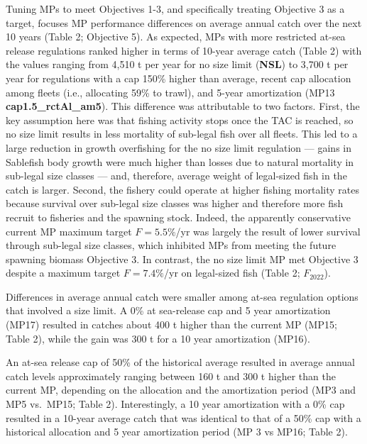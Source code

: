 \documentclass[11pt]{book}
\begin{document}
Tuning MPs to meet Objectives 1-3, and specifically treating Objective 3 as a target, focuses MP performance differences on average annual catch over the next 10 years (Table 2; Objective 5). As expected, MPs with more restricted at-sea release regulations ranked higher in terms of 10-year average catch (Table 2) with the values ranging from 4,510 t per year for no size limit (\textbf{NSL}) to 3,700 t per year for regulations with a cap 150\% higher than average, recent cap allocation among fleets (i.e., allocating 59\% to trawl), and 5-year amortization (MP13 \textbf{cap1.5\_rctAl\_am5}). This difference was attributable to two factors. First, the key assumption here was that fishing activity stops once the TAC is reached, so no size limit results in less mortality of sub-legal fish over all fleets. This led to a large reduction in growth overfishing for the no size limit regulation --- gains in Sablefish body growth were much higher than losses due to natural mortality in sub-legal size classes --- and, therefore, average weight of legal-sized fish in the catch is larger. Second, the fishery could operate at higher fishing mortality rates because survival over sub-legal size classes was higher and therefore more fish recruit to fisheries and the spawning stock. Indeed, the apparently conservative current MP maximum target \(F=5.5\%\)/yr was largely the result of lower survival through sub-legal size classes, which inhibited MPs from meeting the future spawning biomass Objective 3. In contrast, the no size limit MP met Objective 3 despite a maximum target \(F=7.4\%\)/yr on legal-sized fish (Table 2; \(F_{2022}\)).

Differences in average annual catch were smaller among at-sea regulation options that involved a size limit. A 0\% at sea-release cap and 5 year amortization (MP17) resulted in catches about 400 t higher than the current MP (MP15; Table 2), while the gain was 300 t for a 10 year amortization (MP16).

An at-sea release cap of 50\% of the historical average resulted in average annual catch levels approximately ranging between 160 t and 300 t higher than the current MP, depending on the allocation and the amortization period (MP3 and MP5 vs.~MP15; Table 2). Interestingly, a 10 year amortization with a 0\% cap resulted in a 10-year average catch that was identical to that of a 50\% cap with a historical allocation and 5 year amortization period (MP 3 vs MP16; Table 2).
\end{document}
